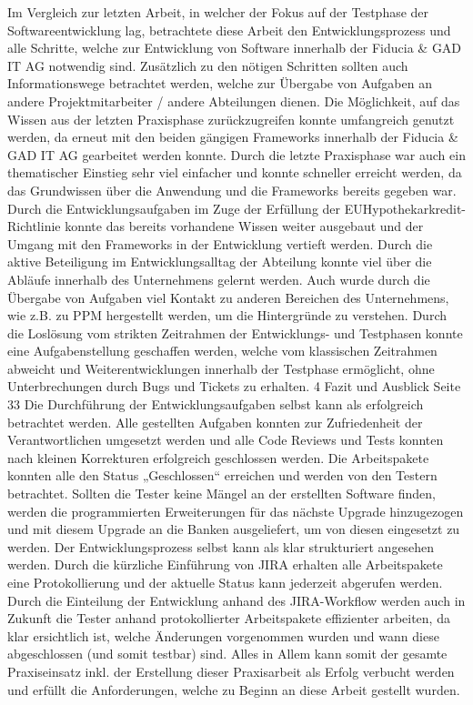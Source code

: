 Im Vergleich zur letzten Arbeit, in welcher der Fokus auf der Testphase der Softwareentwicklung
lag, betrachtete diese Arbeit den Entwicklungsprozess und alle Schritte,
welche zur Entwicklung von Software innerhalb der Fiducia & GAD IT AG notwendig
sind. Zusätzlich zu den nötigen Schritten sollten auch Informationswege betrachtet
werden, welche zur Übergabe von Aufgaben an andere Projektmitarbeiter / andere
Abteilungen dienen.
Die Möglichkeit, auf das Wissen aus der letzten Praxisphase zurückzugreifen konnte
umfangreich genutzt werden, da erneut mit den beiden gängigen Frameworks innerhalb
der Fiducia & GAD IT AG gearbeitet werden konnte. Durch die letzte Praxisphase
war auch ein thematischer Einstieg sehr viel einfacher und konnte schneller
erreicht werden, da das Grundwissen über die Anwendung und die Frameworks bereits
gegeben war. Durch die Entwicklungsaufgaben im Zuge der Erfüllung der EUHypothekarkredit-
Richtlinie konnte das bereits vorhandene Wissen weiter ausgebaut
und der Umgang mit den Frameworks in der Entwicklung vertieft werden.
Durch die aktive Beteiligung im Entwicklungsalltag der Abteilung konnte viel über die
Abläufe innerhalb des Unternehmens gelernt werden. Auch wurde durch die Übergabe
von Aufgaben viel Kontakt zu anderen Bereichen des Unternehmens, wie z.B. zu
PPM hergestellt werden, um die Hintergründe zu verstehen.
Durch die Loslösung vom strikten Zeitrahmen der Entwicklungs- und Testphasen konnte
eine Aufgabenstellung geschaffen werden, welche vom klassischen Zeitrahmen abweicht
und Weiterentwicklungen innerhalb der Testphase ermöglicht, ohne Unterbrechungen
durch Bugs und Tickets zu erhalten.
4 Fazit und Ausblick Seite 33
Die Durchführung der Entwicklungsaufgaben selbst kann als erfolgreich betrachtet
werden. Alle gestellten Aufgaben konnten zur Zufriedenheit der Verantwortlichen
umgesetzt werden und alle Code Reviews und Tests konnten nach kleinen Korrekturen
erfolgreich geschlossen werden. Die Arbeitspakete konnten alle den Status „Geschlossen“
erreichen und werden von den Testern betrachtet. Sollten die Tester keine Mängel
an der erstellten Software finden, werden die programmierten Erweiterungen für das
nächste Upgrade hinzugezogen und mit diesem Upgrade an die Banken ausgeliefert,
um von diesen eingesetzt zu werden.
Der Entwicklungsprozess selbst kann als klar strukturiert angesehen werden. Durch
die kürzliche Einführung von JIRA erhalten alle Arbeitspakete eine Protokollierung
und der aktuelle Status kann jederzeit abgerufen werden. Durch die Einteilung der
Entwicklung anhand des JIRA-Workflow werden auch in Zukunft die Tester anhand
protokollierter Arbeitspakete effizienter arbeiten, da klar ersichtlich ist, welche Änderungen
vorgenommen wurden und wann diese abgeschlossen (und somit testbar)
sind.
Alles in Allem kann somit der gesamte Praxiseinsatz inkl. der Erstellung dieser Praxisarbeit
als Erfolg verbucht werden und erfüllt die Anforderungen, welche zu Beginn an
diese Arbeit gestellt wurden.

